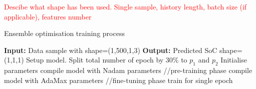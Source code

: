 \textcolor{red}{Descibe what shape has been used. Single sample, history length, batch size (if applicable), features number}
\begin{algorithm}
    \caption{Ensemble optimisation training process}
        \begin{algorithmic}[1]
            \STATE \textbf{Input:} Data sample with shape=(1,500,1,3) 
            \STATE \textbf{Output:} Predicted SoC shape=(1,1,1)
            \STATE Setup model. Split total number of epoch by 30\% to $p_{1}$ and $p_{2}$
            \STATE Initialise parameters
                    \STATE compile model with Nadam parameters //pre-training phase
                \ELSE
                    \STATE compile model with AdaMax parameters //fine-tuning phase
                \ENDIF
                \STATE train for single epoch
            \ENDWHILE
        \end{algorithmic}
    \label{alg:ENS}
\end{algorithm}
